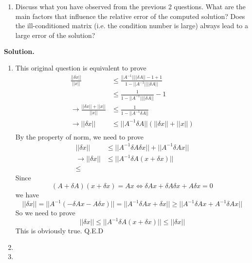 \documentclass[english,onecolumn]{IEEEtran}
\begin{document}
\begin{enumerate}
    
    \item Discuss what you have observed from the previous 2 questions. What are the main factors that influence the relative error of the computed solution? Does the ill-conditioned matrix (i.e. the condition number is large) always lead to a large error of the solution?     
\end{enumerate}

\noindent\textbf{Solution.}
\begin{enumerate}
    \item 
    This original question is equivalent to prove
    \begin{align*}
    \frac{||\delta x||}{||x||} &\le \frac{||A^{-1}||||\delta A|| -1 + 1}{1-||A^{-1}||||\delta A||}\\
    &\le \frac{1}{1-||A^{-1}||||\delta A||}-1\\
   \rightarrow \frac{||\delta x|| + ||x||}{||x||} &\le \frac{1}{1-||A^{-1}\delta A||}\\
    \rightarrow||\delta x|| &\le ||A^{-1}\delta A||(||\delta x|| + ||x||)\\
    \end{align*}
    By the property of norm, we need to prove
    \begin{align*}
    ||\delta x||&\le ||A^{-1}\delta A \delta x|| + ||A^{-1}\delta A x||\\
    \rightarrow ||\delta x|| &\le ||A^{-1}\delta A(x+\delta x)|| \\
    \le 
    \end{align*}
    Since 
    $$(A+\delta A)(x+\delta x) = Ax \Leftrightarrow \delta Ax + \delta A \delta x + A\delta x = 0$$
    we have
    $$||\delta x|| = ||A^{-1}(-\delta Ax - A\delta x)||=||A^{-1}\delta A x + \delta x||\ge ||A^{-1}\delta A x + A^{-1}\delta A x||$$
   	So we need to prove
   	$$||\delta x|| \le ||A^{-1}\delta A(x+\delta x)||\le ||\delta x||$$
   	This is obviously true. Q.E.D
    \item 
    \item
    
\end{enumerate}
\end{document}
